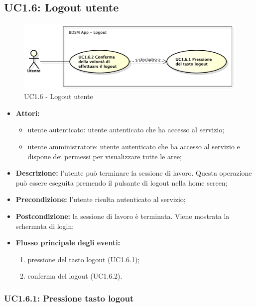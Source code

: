 \pagebreak


\subsection{UC1.6: Logout utente}

\begin{figure}[htbp]
    \centering
    \centerline{\includegraphics[scale=0.5]{./images/UC1_6.pdf}}
    \caption{UC1.6 - Logout utente}
\end{figure}

\begin{itemize}
   	\item \textbf{Attori:}
    \begin{itemize}
    	\item utente autenticato: utente autenticato che ha accesso al servizio;
    	\item utente amministratore: utente autenticato che ha accesso al servizio e dispone dei permessi per visualizzare tutte le aree;
	\end{itemize}
	\item \textbf{Descrizione:} l'utente può terminare la sessione di lavoro. Questa operazione può essere eseguita premendo il pulsante di logout nella home screen;
    \item \textbf{Precondizione:} l'utente risulta autenticato al servizio;
    \item \textbf{Postcondizione:} la sessione di lavoro è terminata. Viene mostrata la schermata di login;
    \item \textbf{Flusso principale degli eventi:}
    \begin{enumerate}
        \item pressione del tasto logout (UC1.6.1);
        \item conferma del logout (UC1.6.2).
    \end{enumerate}
\end{itemize}

\subsubsection{UC1.6.1: Pressione tasto logout}

